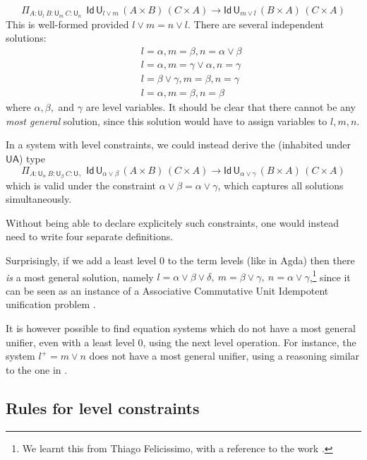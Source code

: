 \documentclass[11pt,a4paper]{article}
\theoremstyle{definition}
\newcommand{\Id}{\mathsf{Id}}
\newcommand{\UU}{\mathsf{U}}
\newcommand{\UA}{\mathsf{UA}}
\begin{document}
$$
    \Pi_{A:\UU_l~{B}:{\UU_m}~{C}:{\UU_n}}
    {~~\Id\,\UU_{l \vee m}\, (A\times B)\,(C \times A)
    \to \Id\,\UU_{m \vee l} \, (B\times A)\,(C \times A)}
$$
This is well-formed provided $l \vee m = n \vee l$.
There are several independent solutions:
\begin{eqnarray*}
&&l = \alpha, m = \beta, n = \alpha \vee \beta\\
&&l = \alpha, m = \gamma \vee \alpha, n = \gamma\\
&&l = \beta \vee \gamma, m = \beta, n = \gamma\\
&&l = \alpha, m = \beta, n = \beta
\end{eqnarray*}
where $\alpha, \beta,$ and $\gamma$ are level
variables. It should be clear that there cannot be any {\em most general} solution, since this solution would have to
assign variables to $l,m,n$.




In a system with level constraints,
we could instead derive the (inhabited under $\UA$) type
$$
    \Pi_{A:\UU_\alpha~{B}:{\UU_\beta}~{C}:{\UU_\gamma}}
    {~~\Id\,\UU_{\alpha \vee \beta}\, (A\times B)\,(C \times A)
    \to \Id\,\UU_{\alpha \vee \gamma}\, (B\times A)\,(C \times A)}
$$
which is valid under the constraint
$\alpha \vee \beta = \alpha \vee \gamma$,
which captures all solutions simultaneously.

Without being able to declare explicitely such constraints, %
one would instead need to write four separate definitions.

 Surprisingly, if we add a least level $0$ to the term levels (like in Agda) then there \emph{is} a most general solution,
 namely $l = \alpha\vee\beta\vee\delta,~m = \beta\vee\gamma,~n = \alpha\vee\gamma$,\footnote{We learnt this from
 Thiago Felicissimo, with a reference to the work \cite{FBB:impred2pred}.}
 since it can be seen as an instance of
 a Associative Commutative Unit Idempotent unification problem \cite{BaaderS94}.

 It is however possible to find equation systems which do not have a most general unifier, even with a least level $0$, using
 the next level operation. For instance, the system $l^+ = m\vee n$ does not have a most general unifier, using a reasoning
 similar to the one in \cite{FBB:impred2pred}.

\subsection*{Rules for level constraints}%
\end{document}
